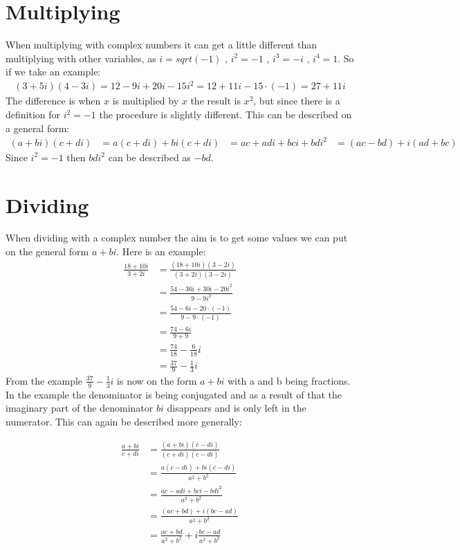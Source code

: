 \section{Multiplying}
When multiplying with complex numbers it can get a little different than multiplying with other variables, as $i=sqrt(-1)$ , $i^2=-1$ , $i^3=-i$ , $i^4=1$. So if we take an example: \\
\begin{align*}
(3+5i)(4-3i) = 12 - 9i + 20i - 15i^2 = 12 + 11i - 15 \cdot (-1) = 27 + 11i
\end{align*}
The difference is when $x$ is multiplied by $x$ the result is $x^2$, but since there is a definition for $i^2=-1$ the procedure is slightly different. 
This can be described on a general form:
\begin{align*}
(a + bi)(c + di) &= a(c + di) + bi(c + di)
&= ac + adi + bci + bdi^2
&= (ac - bd) + i(ad + bc)
\end{align*}
Since $i^2 = -1$ then $bdi^2$ can be described as $-bd$.

\section{Dividing}
When dividing with a complex number the aim is to get some values we can put on the general form $a + bi$. Here is an example:
\begin{align*}
\frac{18 + 10i}{3 + 2i} &= \frac{(18 + 10i)(3 - 2i)}{(3+2i)(3-2i)} \\[1em]
&= \frac{54 - 36i + 30i - 20i^2}{9 - 9i^2} \\[1em]
&= \frac{54 - 6i - 20 \cdot (-1)}{9 - 9 \cdot (-1)} \\[1em]
&= \frac{74 - 6i}{9 + 9} \\[1em]
&= \frac{74}{18} - \frac{6}{18}i \\[1em]
&= \frac{37}{9} - \frac{1}{3}i
\end{align*}
From the example $\frac{37}{9} - \frac{1}{3}i$ is now on the form $a+bi$ with a and b being fractions. In the example the denominator is being conjugated and as a result of that the imaginary part of the denominator $bi$ disappears and is only left in the numerator. 
This can again be described more generally:
\begin{center}
\begin{align*}
\frac{a + bi}{c + di} 										
&= \frac{(a+bi)(c-di)}{(c+di)(c-di)} 						\\[1em]
&= \frac{a(c-di)+bi(c-di)}{a^2+b^2} 							\\[1em]
&= \frac{ac-adi+bci-bdi^2}{a^2+b^2}							\\[1em]
&= \frac{(ac+bd)+i(bc-ad)}{a^2+b^2}							\\[1em]
&= \frac{ac+bd}{a^2+b^2}+i \frac{bc-ad}{a^2+b^2}				
\end{align*}
\end{center}

